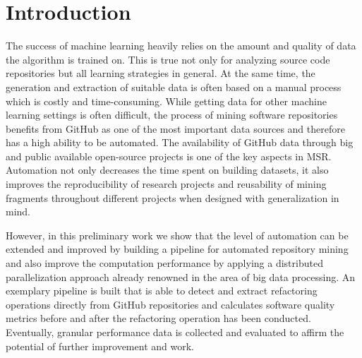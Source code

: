 
\section{Introduction}
\label{sec:intro}
The success of machine learning heavily relies on the amount and quality of data the algorithm is trained on. This is true not only for analyzing source code repositories but all learning strategies in general. At the same time, the generation and extraction of suitable data is often based on a manual process which is costly and time-consuming. While getting data for other machine learning settings is often difficult, the process of mining software repositories benefits from GitHub as one of the most important data sources and therefore has a high ability to be automated. The availability of GitHub data through big and public available open-source projects is one of the key aspects in MSR. Automation not only decreases the time spent on building datasets, it also improves the reproducibility of research projects and reusability of mining fragments throughout different projects when designed with generalization in mind.

However, in this preliminary work we show that the level of automation can be extended and improved by building a pipeline for automated repository mining and also improve the computation performance by applying a distributed parallelization approach already renowned in the area of big data processing. An exemplary pipeline is built that is able to detect and extract refactoring operations directly from GitHub repositories and calculates software quality metrics before and after the refactoring operation has been conducted. Eventually,  granular performance data is collected and evaluated to affirm the potential of further improvement and work.
